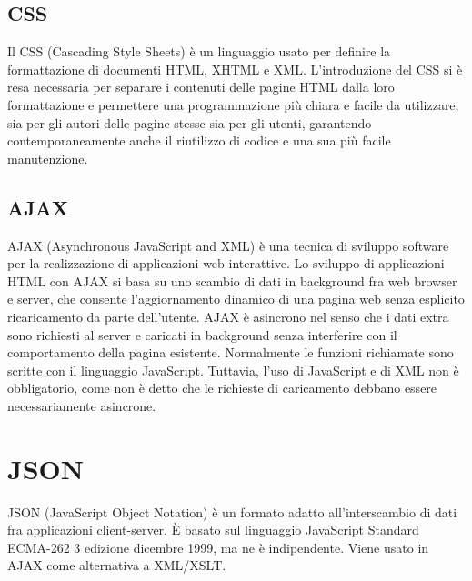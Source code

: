 \subsection{CSS}
Il CSS (Cascading Style Sheets) \cite{CSS:site} è un linguaggio usato per definire la formattazione di documenti HTML, XHTML e XML. L'introduzione del CSS si è resa necessaria per separare i contenuti delle pagine HTML dalla loro formattazione e permettere una programmazione più chiara e facile da utilizzare, sia per gli autori delle pagine stesse sia per gli utenti, garantendo contemporaneamente anche il riutilizzo di codice e una sua più facile manutenzione.

\subsection{AJAX}
AJAX (Asynchronous JavaScript and XML) \cite{AJAX:site} è una tecnica di sviluppo software per la realizzazione di applicazioni web interattive. Lo sviluppo di applicazioni HTML con AJAX si basa su uno scambio di dati in background fra web browser e server, che consente l'aggiornamento dinamico di una pagina web senza esplicito ricaricamento da parte dell'utente. AJAX è asincrono nel senso che i dati extra sono richiesti al server e caricati in background senza interferire con il comportamento della pagina esistente. Normalmente le funzioni richiamate sono scritte con il linguaggio JavaScript. Tuttavia, l'uso di JavaScript e di XML non è obbligatorio, come non è detto che le richieste di caricamento debbano essere necessariamente asincrone.

\section{JSON}
JSON (JavaScript Object Notation) \cite{json:site} è un formato adatto all'interscambio di dati fra applicazioni client-server. È basato sul linguaggio JavaScript Standard ECMA-262 3 edizione dicembre 1999, ma ne è indipendente. Viene usato in AJAX come alternativa a XML/XSLT.